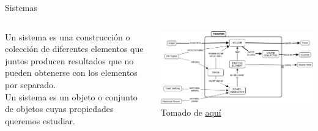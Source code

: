 \documentclass[aspectratio=169]{beamer}
\begin{document}
\begin{frame}{Sistemas}
    \begin{columns}[c, onlytextwidth]
        \begin{column}{0.4\textwidth}
        Un sistema es una construcción o colección de diferentes elementos que juntos producen resultados que no pueden obtenerse con los elementos por separado\cite{INCOSE}.\\[8pt]
        Un sistema es un objeto o conjunto de objetos cuyas propiedades queremos estudiar\cite{modelica}.
        \end{column}
        \begin{column}{0.6\textwidth}
            \begin{center}
               \includegraphics[width=\textwidth]{fig/tostadora.jpg}\\
               \tiny{Tomado de \href{https://deseng.ryerson.ca/dokuwiki/_detail/design:toasterarchitecture.jpg?id=design\%3Asystem_diagram}{aquí}}
            \end{center}
        \end{column}
    \end{columns}
\end{frame}
\end{document}
